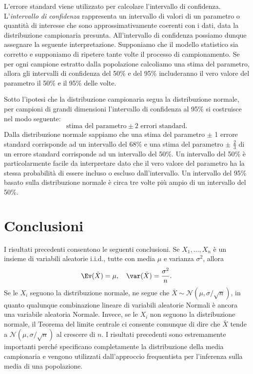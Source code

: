 L'errore standard viene utilizzato per calcolare l'intervallo di confidenza.
L'\emph{intervallo di confidenza} rappresenta un intervallo di valori di un parametro o quantità di interesse che sono approssimativamente coerenti con i dati, data la distribuzione campionaria presunta. 
All'intervallo di confidenza possiamo dunque assegnare la seguente interpretazione.
Supponiamo che il modello statistico sia corretto e supponiamo di ripetere tante volte il processo di campionamento.
Se per ogni campione estratto dalla popolazione calcoliamo una stima del parametro, allora gli intervalli di confidenza del 50\% e del 95\% includeranno il vero valore del parametro il 50\% e il 95\% delle volte.

Sotto l'ipotesi che la distribuzione campionaria segua la distribuzione normale, per campioni di grandi dimensioni l'intervallo di confidenza al 95\% si costruisce nel modo seguente:
\[
\text{stima del parametro} \pm 2 \text{ errori standard.} 
\]
Dalla distribuzione normale sappiamo che una stima del parametro $\pm$ 1 errore standard corrisponde ad un intervallo del 68\% e una stima del parametro $\pm$ $\frac{2}{3}$ di un errore standard corrisponde ad un intervallo del 50\%. 
Un intervallo del 50\% è particolarmente facile da interpretare dato che 
il vero valore del parametro ha la stessa probabilità di essere incluso o escluso dall'intervallo. 
Un intervallo del 95\% basato sulla distribuzione normale è circa tre volte più ampio di un intervallo del 50\%.



\section*{Conclusioni}

I risultati precedenti consentono le seguenti conclusioni.
Se $X_1, \dots, X_n$ è un insieme di variabili aleatorie i.i.d., tutte con media $\mu$ e varianza $\sigma^2$, allora
\begin{equation}
\Ev(\bar{X}) = \mu, \quad \var(\bar{X}) = \frac{\sigma^2}{n}.\notag
\end{equation}
Se le $X_i$ seguono la distribuzione normale, ne segue che $\bar{X} \sim \mathcal{N}(\mu, \sigma/\sqrt{n})$, in quanto qualunque combinazione lineare di variabili aleatorie Normali è ancora una variabile aleatoria Normale.
Invece, se le $X_i$ non seguono la distribuzione normale, il Teorema del limite centrale ci consente comunque di dire che $\bar{X}$ tende a $\mathcal{N}(\mu, \sigma/\sqrt{n})$ al crescere di $n$.
I risultati precedenti sono estremamente importanti perché specificano completamente la distribuzione della media campionaria e vengono utilizzati dall'approccio frequentista per l'inferenza sulla media di una popolazione.



